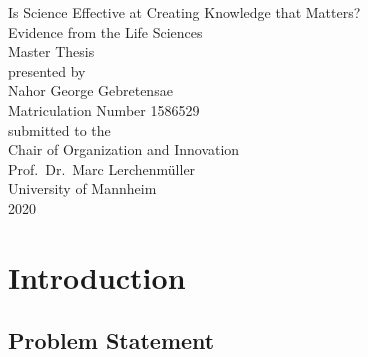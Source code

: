 \documentclass[11pt,titlepage,oneside,openany]{book}
\begin{document}
\begin{titlepage}
	\vspace*{2cm}
  \begin{center}
   {\Large Is Science Effective at Creating Knowledge that Matters?\\
	\small Evidence from the Life Sciences\\}
   \vspace{2cm} 
   {Master Thesis\\}
   \vspace{2cm}
   {presented by\\
    Nahor George Gebretensae\\
		Matriculation Number 1586529\\
   }
   \vspace{1cm} 
   {submitted to the\\
    Chair of Organization and Innovation\\
    Prof.\ Dr.\ Marc Lerchenmüller\\
    University of Mannheim\\} \vspace{2cm}
   {2020}
  \end{center}
\end{titlepage}


\tableofcontents

\listoffigures

\listoftables

\newpage


\chapter{Introduction}
\label{cha:intro}

\section{Problem Statement}
\end{document}
